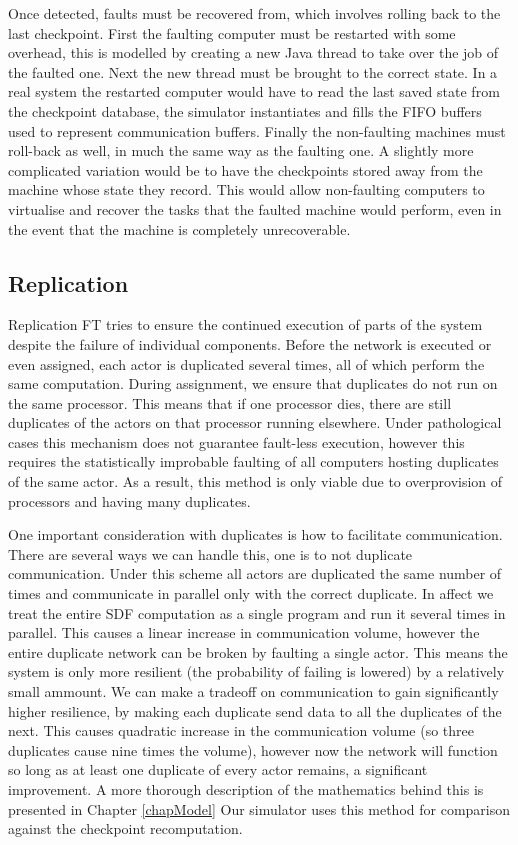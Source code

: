 Once detected, faults must be recovered from, which involves rolling back to the last checkpoint.
First the faulting computer must be restarted with some overhead, this is modelled by creating a new Java thread to take over the job of the faulted one.
Next the new thread must be brought to the correct state.
In a real system the restarted computer would have to read the last saved state from the checkpoint database, the simulator instantiates and fills the FIFO buffers used to represent communication buffers.
Finally the non-faulting machines must roll-back as well, in much the same way as the faulting one.
A slightly more complicated variation would be to have the checkpoints stored away from the machine whose state they record.
This would allow non-faulting computers to virtualise and recover the tasks that the faulted machine would perform, even in the event that the machine is completely unrecoverable.

\subsection{Replication}

Replication FT tries to ensure the continued execution of parts of the system despite the failure of individual components.
Before the network is executed or even assigned, each actor is duplicated several times, all of which perform the same computation.
During assignment, we ensure that duplicates do not run on the same processor.
This means that if one processor dies, there are still duplicates of the actors on that processor running elsewhere.
Under pathological cases this mechanism does not guarantee fault-less execution, however this requires the statistically improbable faulting of all computers hosting duplicates of the same actor.
As a result, this method is only viable due to overprovision of processors and having many duplicates.

One important consideration with duplicates is how to facilitate communication.
There are several ways we can handle this, one is to not duplicate communication.
Under this scheme all actors are duplicated the same number of times and communicate in parallel only with the correct duplicate.
In affect we treat the entire SDF computation as a single program and run it several times in parallel.
This causes a linear increase in communication volume, however the entire duplicate network can be broken by faulting a single actor.
This means the system is only more resilient (the probability of failing is lowered) by a relatively small ammount.
We can make a tradeoff on communication to gain significantly higher resilience, by making each duplicate send data to all the duplicates of the next.
This causes quadratic increase in the communication volume (so three duplicates cause nine times the volume), however now the network will function so long as at least one duplicate of every actor remains, a significant improvement.
A more thorough description of the mathematics behind this is presented in Chapter \ref{chapModel}
Our simulator uses this method for comparison against the checkpoint recomputation.

